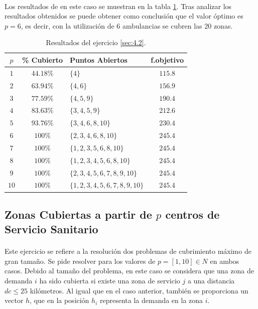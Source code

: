 \documentclass[spanish]{article}
\begin{document}
			\paragraph{}
			Los resultados de en este caso se muestran en la tabla \ref{table:sol-4.2}. Tras analizar los resultados obtenidos se puede obtener como conclusión que el valor óptimo es $p = 6$, es decir, con la utilización de 6 ambulancias se cubren las 20 zonas.


			\begin{table}[h]
				\begin{center}
					\begin{tabular}{|c || c || l || c | }
						\hline
						$p$		&	\% Cubierto	& Puntos Abiertos 					& f.objetivo \\ \hline \hline
						$1$ 	& $44.18\%$ & $\{4\}$ 										& $115.8$ \\ \hline
		     		$2$ 	& $63.94\%$ & $\{4, 6\}$									& $156.9$ \\ \hline
						$3$ 	& $77.59\%$ & $\{4,5,9\}$ 								& $190.4$ \\ \hline
						$4$ 	& $83.63\%$ & $\{3,4,5,9\}$ 							& $212.6$ \\ \hline
						$5$ 	& $93.76\%$ & $\{3,4,6,8,10\}$ 						& $230.4$ \\ \hline
						$6$ 	& $100\%$ 	& $\{2,3,4,6,8,10\}$					& $245.4$ \\ \hline
						$7$ 	& $100\%$ 	& $\{1,2,3,5,6,8,10 \}$				& $245.4$ \\ \hline
						$8$ 	& $100\%$ 	& $\{1,2,3,4,5,6,8,10\}$			& $245.4$ \\ \hline
						$9$ 	& $100\%$ 	& $\{2,3,4,5,6,7,8,9,10\}$ 		& $245.4$ \\ \hline
						$10$	& $100\%$ 	& $\{1,2,3,4,5,6,7,8,9,10\}$	& $245.4$ \\
						\hline
					\end{tabular}
				\end{center}
				\caption{Resultados del ejercicio \ref{sec:4.2}.}
				\label{table:sol-4.2}
			\end{table}


		\subsection{Zonas Cubiertas a partir de $p$ centros de Servicio Sanitario}
		\label{sec:4.3}

			\paragraph{}
			Este ejercicio se refiere a la resolución dos problemas de cubrimiento máximo de gran tamaño. Se pide resolver para los valores de $p = [1, 10] \in N$ en ambos casos. Debido al tamaño del problema, en este caso se considera que una zona de demanda $i$ ha sido cubierta si existe una zona de servicio $j$ a una distancia $dc \leq 25$ kilómetros. Al igual que en el caso anterior, también se proporciona un vector $h$, que en la posición $h_i$ representa la demanda en la zona $i$.
\end{document}
